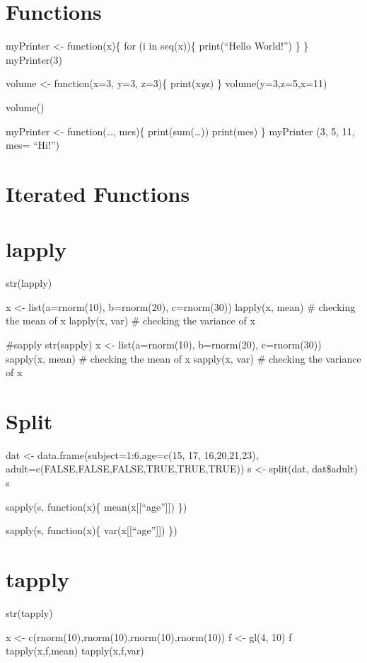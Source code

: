 \documentclass[
]{article}
\begin{document}
\section{Functions}\label{functions}

myPrinter \textless- function(x)\{ for (i in seq(x))\{ print(``Hello
World!'') \} \} myPrinter(3)

volume \textless- function(x=3, y=3, z=3)\{ print(x\emph{y}z) \}
volume(y=3,z=5,x=11)

volume()

myPrinter \textless- function(\ldots, mes)\{ print(sum(\ldots))
print(mes) \} myPrinter (3, 5, 11, mes= ``Hi!'')

\section{Iterated Functions}\label{iterated-functions}

\section{lapply}\label{lapply}

str(lapply)

x \textless- list(a=rnorm(10), b=rnorm(20), c=rnorm(30)) lapply(x, mean)
\# checking the mean of x lapply(x, var) \# checking the variance of x

\#sapply str(sapply) x \textless- list(a=rnorm(10), b=rnorm(20),
c=rnorm(30)) sapply(x, mean) \# checking the mean of x sapply(x, var) \#
checking the variance of x

\section{Split}\label{split}

dat \textless- data.frame(subject=1:6,age=c(15, 17, 16,20,21,23),
adult=c(FALSE,FALSE,FALSE,TRUE,TRUE,TRUE)) s \textless- split(dat,
dat\$adult) s

sapply(s, function(x)\{ mean(x{[}{[}``age''{]}{]}) \})

sapply(s, function(x)\{ var(x{[}{[}``age''{]}{]}) \})

\section{tapply}\label{tapply}

str(tapply)

x \textless- c(rnorm(10),rnorm(10),rnorm(10),rnorm(10)) f \textless-
gl(4, 10) f tapply(x,f,mean) tapply(x,f,var)
\end{document}
